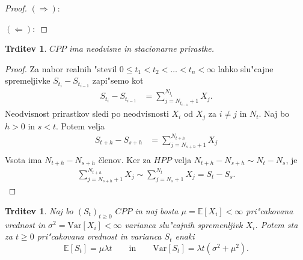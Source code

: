\documentclass[12pt, a4paper, reqno]{amsart}
\theoremstyle{definition}
\theoremstyle{plain}
\newtheorem{trditev}[definicija]{Trditev}
\newcommand{\E}{\mathbb{E}}
\newcommand{\1}{\mathds{1}}
\newcommand{\Var}[1]{\text{Var}\left[#1\right]}
\begin{document}
        \begin{proof}
            $(\Rightarrow):$

            $(\Leftarrow):$
        \end{proof}

        \begin{trditev}
            $CPP$ ima neodvisne in stacionarne prirastke.
            \label{trd:neodvPrirCPP}
        \end{trditev}

        \begin{proof}
            Za nabor realnih "stevil $0 \leq t_1 < t_2 < \ldots < t_n < \infty$ lahko slu"cajne
            spremeljivke $S_{t_i} - S_{t_{i-1}}$ zapi"semo kot
            \begin{align*}
                S_{t_i} - S_{t_{i-1}} &= \sum_{j=N_{t_{i-1}}+1}^{N_{t_i}} X_j. 
            \end{align*}
            Neodvisnost prirastkov sledi po neodvisnosti $X_i$ od $X_j$ za $i\neq j$ in $N_t$. 
            Naj bo $h > 0$ in $s < t$. Potem velja
            \begin{align*}
                S_{t+h} - S_{s+h} &= \sum_{j=N_{s+h}+1}^{N_{t+h}} X_j \\
            \end{align*}
            Vsota ima $N_{t+h} - N_{s+h}$ členov. Ker za $HPP$ velja 
            $N_{t+h} - N_{s+h} \sim N_t - N_s$, je 
            \begin{align*}
                \sum_{j=N_{s+h}+1}^{N_{t+h}} X_j \sim \sum_{j=N_{s}+1}^{N_{t}} X_j = S_t - S_s.
            \end{align*}
        \end{proof}

        \begin{trditev}
            Naj bo $(S_t)_{t\geq 0}$ $CPP$ in naj bosta $\mu = \E\left[X_i\right] < \infty$ 
            pri"cakovana vrednost in $\sigma^2= \Var{X_i} <\infty$ varianca
            slu"cajnih spremenljivk $X_i$. Potem sta za $t\geq0$ pri"cakovana vrednost in 
            varianca $S_t$ enaki 
            \begin{equation*}
                \E\left[S_t\right] = \mu\lambda t \qquad \text{in} \qquad \Var{S_t} = \lambda t\left(\sigma^2 + \mu^2\right).
            \end{equation*}
            \label{trd:PricVarCPP}
        \end{trditev}
\end{document}

